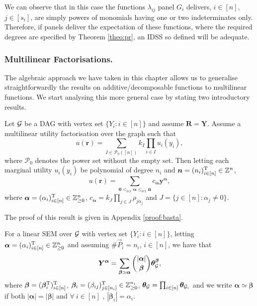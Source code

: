 We can observe that in this case the functions $\lambda_{ij}$ panel $G_i$ delivers, $i\in[n]$, $j\in[s_i]$, are simply powers of monomials having one or two indeterminates only. Therefore, if panels deliver the expectation of these functions, where the required degrees are specified by Theorem \ref{theo:pr}, an IDSS so defined will be adequate. 

\subsubsection{Multilinear Factorisations.}
The algebraic approach we have taken in this chapter allows us to generalise  straightforwardly the results on additive/decomposable functions to multilinear functions. We start analysing this more general case by stating two introductory results. 

\begin{proposition}
\label{prop:1}
Let $\mathcal{G}$ be a DAG with vertex set $\{Y_i:i\in[n]\}$ and assume $\bm{R}=\bm{Y}$. Assume a multilinear utility factorisation over the graph such that
\begin{equation*}
\label{eq:multidag}
u(\bm{r})=\sum_{I\in\mathcal{P}_0([n])}k_I\prod_{i\in I}u_i(y_i),
\end{equation*} 
where $\mathcal{P}_0$ denotes the power set without the empty set. Then letting each marginal utility $u_i(y_i)$ be polynomial of degree $n_i$ and $\bm{n}=(n_i)_{i\in[n]}^{\textnormal{T}}\in\mathbb{Z}^n$,
\begin{equation}
\label{eq:multiutpol}
u(\bm{r})=\sum_{\bm{0}<_{lex}\bm{\alpha}\leq_{lex}\bm{n}}c_{\bm{\alpha}}\bm{y}^{\bm{\alpha}},
\end{equation}
where $\bm{\alpha}=(\alpha_i)_{i\in[n]}^{\textnormal{T}}\in\mathbb{Z}^{n}_{\geq 0}$, $c_{\bm{\alpha}}=k_J\prod_{j\in J}\rho_{j\alpha_j}$ and $J=\{j\in[n]: \alpha_j\neq 0\}$. 
\end{proposition}

The proof of this result is given in Appendix \ref{proof:basta}.

\begin{proposition}
\label{prop:2}
For a linear SEM over $\mathcal{G}$ with vertex set $\{Y_i:i\in[n]\}$, letting $\bm{\alpha}=(\alpha_i)_{i\in[n]}^{\textnormal{T}}\in\mathbb{Z}^{n}_{\geq 0}$ and assuming $\#\vec{P}_i=n_i$, $i\in[n]$, we have that 
\begin{equation}
\label{eq:multiciao}
\bm{Y}^{\bm{\alpha}}=\sum_{\bm{\beta}\simeq \bm{\alpha}}\binom{|\bm{\alpha}|}{\bm{\beta}}\bm{\theta}_{\Gr}^{\bm{\beta}},
\end{equation}
where $\bm{\beta}=(\bm{\beta}_i^{\textnormal{T}})^{\textnormal{T}}_{i\in[n]}$, $\bm{\beta}_i=(\beta_{ij})^{\textnormal{T}}_{j\in[n_i]}\in\mathbb{Z}^{n_i}_{\geq 0}$, $\bm{\theta}_{\mathcal{G}}=\prod_{i\in[n]}\bm{\theta}_{\mathcal{G}_i}$ and we write $\bm{\alpha}\simeq \bm{\beta}$ if both $|\bm{\alpha}|=|\bm{\beta}|$ and $\forall ~ i\in[n]$ , $|\bm{\beta}_i|=\alpha_i$.  
\end{proposition}

